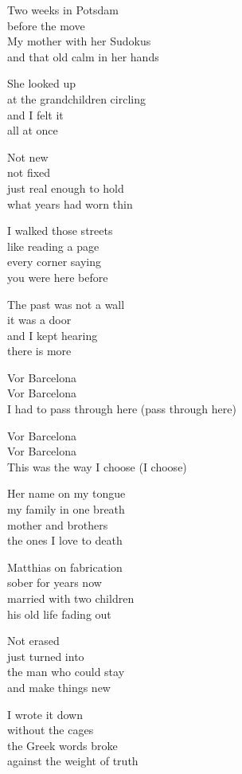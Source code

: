 \begin{lyrics}
Two weeks in Potsdam\\
before the move\\
My mother with her Sudokus\\
and that old calm in her hands

She looked up\\
at the grandchildren circling\\
and I felt it\\
all at once

Not new\\
not fixed\\
just real enough to hold\\
what years had worn thin

I walked those streets\\
like reading a page\\
every corner saying\\
you were here before

The past was not a wall\\
it was a door\\
and I kept hearing\\
there is more

Vor Barcelona\\
Vor Barcelona\\
I had to pass through here (pass through here)

Vor Barcelona\\
Vor Barcelona\\
This was the way I choose (I choose)

Her name on my tongue\\
my family in one breath\\
mother and brothers\\
the ones I love to death

Matthias on fabrication\\
sober for years now\\
married with two children\\
his old life fading out

Not erased\\
just turned into\\
the man who could stay\\
and make things new

I wrote it down\\
without the cages\\
the Greek words broke\\
against the weight of truth


\end{lyrics}
